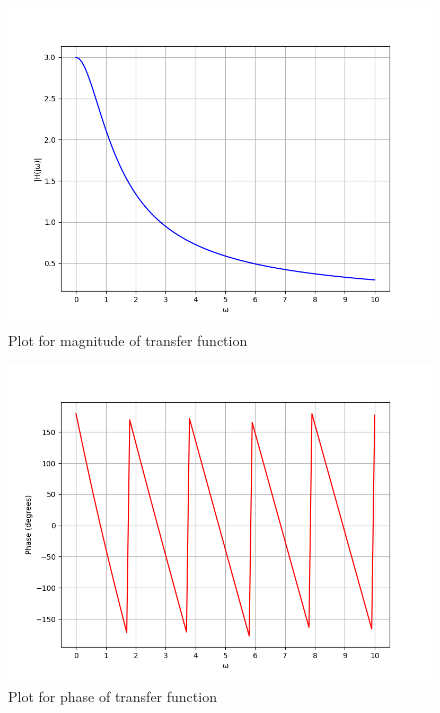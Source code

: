 \documentclass[journal,12pt,twocolumn]{IEEEtran}
\theoremstyle{remark}
\begin{document}
\begin{figure}[h!]
    \centering
    \includegraphics[width=\columnwidth]{figs/freq.png}
    \caption{Plot for magnitude of transfer function}
    \label{fig:gate2022in11fig1}
\end{figure}
\begin{figure}[h!]
    \centering
    \includegraphics[width=\columnwidth]{figs/phase.png}
    \caption{Plot for phase of transfer function}
    \label{fig:gate2022in11fig2}
\end{figure}
\end{document}
